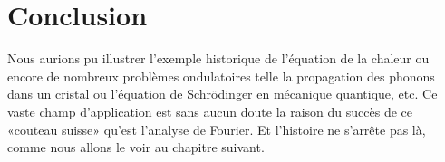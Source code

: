 
\section{Conclusion} %
\label{sec:conclusion}
Nous aurions pu illustrer l'exemple historique de l'équation de la chaleur ou encore de nombreux problèmes ondulatoires telle la propagation des phonons dans un cristal ou l'équation de Schrödinger en mécanique quantique, etc. Ce vaste champ d'application est sans aucun doute la raison du succès de ce «couteau suisse» qu'est l'analyse de Fourier. Et l'histoire ne s'arrête pas là, comme nous allons le voir au chapitre suivant.














